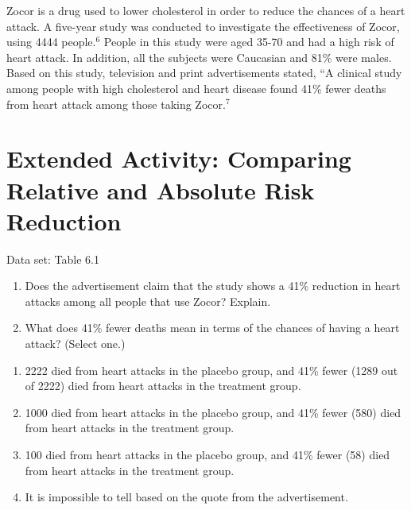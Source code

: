 \documentclass[
]{report}
\providecommand{\tightlist}{%
  \setlength{\itemsep}{0pt}\setlength{\parskip}{0pt}}
\begin{document}
Zocor is a drug used to lower cholesterol in order to reduce the chances of a heart attack. A five-year study was conducted to investigate the effectiveness of Zocor, using 4444 people.\(^6\) People in this study were aged 35-70 and had a high risk of heart attack. In addition, all the subjects were Caucasian and 81\% were males. Based on this study, television and print advertisements stated, ``A clinical study among people with high cholesterol and heart disease found 41\% fewer deaths from heart attack among those taking Zocor.\(^7\)

\section*{Extended Activity: Comparing Relative and Absolute Risk Reduction}\label{extended-activity-comparing-relative-and-absolute-risk-reduction}

Data set: Table 6.1

\begin{enumerate}
\def\labelenumi{\arabic{enumi}.}
\setcounter{enumi}{24}
\item
  Does the advertisement claim that the study shows a 41\% reduction in heart attacks among all people that use Zocor? Explain.
\item
  What does 41\% fewer deaths mean in terms of the chances of having a heart attack? (Select one.)\\
\end{enumerate}

\begin{enumerate}
\def\labelenumi{\alph{enumi}.}
\tightlist
\item
  2222 died from heart attacks in the placebo group, and 41\% fewer (1289 out of 2222) died from heart attacks in the treatment group.\\
\item
  1000 died from heart attacks in the placebo group, and 41\% fewer (580) died from heart attacks in the treatment group.\\
\item
  100 died from heart attacks in the placebo group, and 41\% fewer (58) died from heart attacks in the treatment group.\\
\item
  It is impossible to tell based on the quote from the advertisement.
\end{enumerate}
\end{document}
